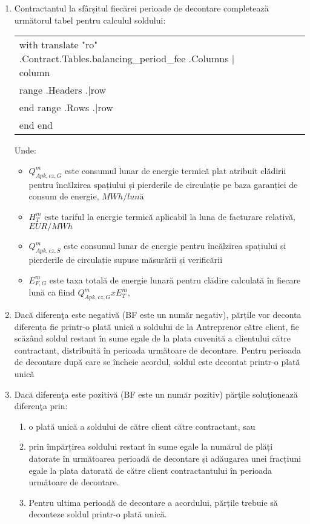 \begin{enumerate}
\begin{enumerate}
\item Contractantul la sfârșitul fiecărei perioade de decontare completează următorul tabel pentru calculul soldului:


\begin{center}
\begin{tabu}{|X|X|X|X|X|X|X|} \tabucline{}
{{with translate "ro" .Contract.Tables.balancing_period_fee}} %
	{{.Columns | column}} \\\tabucline{}
	{{range .Headers}} {{.|row}} \\\tabucline{} {{end}} %
	{{range .Rows}} {{.|row}} \\\tabucline{} {{end}} %
{{end}}
\end{tabu}
\end{center}

Unde:
\begin{itemize}[label={}]
\item $Q_{Apk,cz, G}^{m}$ \quad este consumul lunar de energie termică plat atribuit clădirii pentru încălzirea spațiului și pierderile de circulație pe baza garanției de consum de energie, $MWh / lună$
\item $H_{T}^{m}$ \quad este tariful la energie termică aplicabil la luna de facturare relativă, $EUR / MWh$
\item $Q_{Apk,cz, S}^{m}$ \quad este consumul lunar de energie pentru încălzirea spațiului și pierderile de circulație supuse măsurării și verificării
\item $E_{F, G}^{m}$ \quad este taxa totală de energie lunară pentru clădire calculată în fiecare lună ca fiind $Q_{Apk,cz, G}^{m} x E_{T}^{m}$,
\end{itemize}

\item Dacă diferenţa este negativă (BF este un număr negativ), părțile vor deconta diferența fie printr-o plată unică a soldului de la Antreprenor către client, fie scăzând soldul restant în sume egale de la plata cuvenită a clientului către contractant, distribuită în perioada următoare de decontare. Pentru perioada de decontare după care se încheie acordul, soldul este decontat printr-o plată unică
\item Dacă diferenţa este pozitivă (BF este un număr pozitiv) părţile soluţionează diferenţa prin:

  \begin{enumerate}
    \item o plată unică a soldului de către client către contractant, sau
    \item prin împărțirea soldului restant în sume egale la numărul de plăți datorate în următoarea perioadă de decontare și adăugarea unei fracțiuni egale la plata datorată de către client contractantului în perioada următoare de decontare.
    \item Pentru ultima perioadă de decontare a acordului, părțile trebuie să deconteze soldul printr-o plată unică.
  \end{enumerate}


\end{enumerate}
\end{enumerate}
